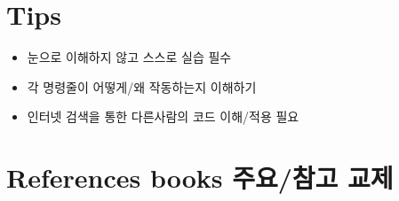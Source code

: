 \documentclass[
]{book}
\providecommand{\tightlist}{%
  \setlength{\itemsep}{0pt}\setlength{\parskip}{0pt}}
\begin{document}
\hypertarget{tips}{%
\section{Tips}\label{tips}}

\begin{itemize}
\tightlist
\item
  눈으로 이해하지 않고 스스로 실습 필수
\item
  각 명령줄이 어떻게/왜 작동하는지 이해하기
\item
  인터넷 검색을 통한 다른사람의 코드 이해/적용 필요
\end{itemize}

\hypertarget{references-books-uxc8fcuxc694uxcc38uxace0-uxad50uxc81c}{%
\section{References books 주요/참고 교제}\label{references-books-uxc8fcuxc694uxcc38uxace0-uxad50uxc81c}}
\end{document}
